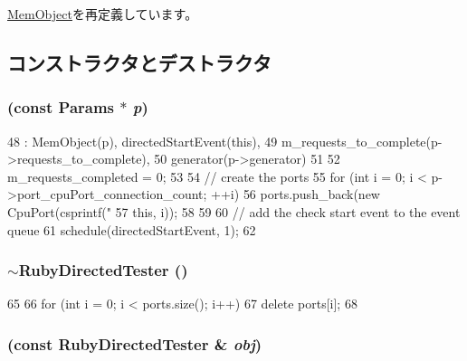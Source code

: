 \hyperlink{classMemObject_a905bbc621eeec0ed08859e21c8c95412}{MemObject}を再定義しています。

\subsection{コンストラクタとデストラクタ}
\hypertarget{classRubyDirectedTester_af56e86da68a0ae2168e4a4da7db4d3dd}{
\subsubsection[{RubyDirectedTester}]{ (const {\bf Params} $\ast$ {\em p})}}
\label{classRubyDirectedTester_af56e86da68a0ae2168e4a4da7db4d3dd}



\begin{DoxyCode}
48   : MemObject(p), directedStartEvent(this),
49     m_requests_to_complete(p->requests_to_complete),
50     generator(p->generator)
51 {
52     m_requests_completed = 0;
53 
54     // create the ports
55     for (int i = 0; i < p->port_cpuPort_connection_count; ++i) {
56         ports.push_back(new CpuPort(csprintf("%
57                                     this, i));
58     }
59 
60     // add the check start event to the event queue
61     schedule(directedStartEvent, 1);
62 }
\end{DoxyCode}
\hypertarget{classRubyDirectedTester_acdd0dcac0bc534b5d325cf0f16cf7d33}{
\subsubsection[{$\sim$RubyDirectedTester}]{\setlength{\rightskip}{0pt plus 5cm}$\sim${\bf RubyDirectedTester} ()}}
\label{classRubyDirectedTester_acdd0dcac0bc534b5d325cf0f16cf7d33}



\begin{DoxyCode}
65 {
66     for (int i = 0; i < ports.size(); i++)
67         delete ports[i];
68 }
\end{DoxyCode}
\hypertarget{classRubyDirectedTester_a77546a6ae770d1afd25e330d3643721f}{
\subsubsection[{RubyDirectedTester}]{ (const {\bf RubyDirectedTester} \& {\em obj})}}
\label{classRubyDirectedTester_a77546a6ae770d1afd25e330d3643721f}


